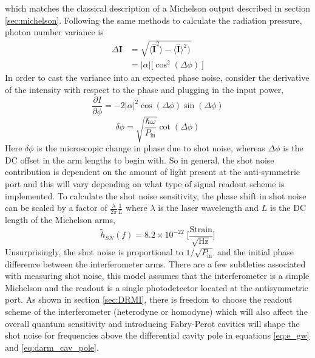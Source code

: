 		which matches the classical description of a Michelson output described in section \ref{sec:michelson}. Following the same methods to calculate the radiation pressure, photon number variance is
		\begin{equation} 
		\begin{aligned}
		\Delta \mathbf{I} 	&= \sqrt{\langle \mathbf{\hat{I}}^2 \rangle  - \langle \mathbf{\hat{I}} \rangle^2)} \\
							&= \vert \alpha \vert \big[ \cos^2(\Delta \phi)\ \big] 
		\end{aligned}
		\end{equation}
		In order to cast the variance into an expected phase noise, consider the derivative of the intensity with respect to the phase and plugging in the input power,
		\begin{equation}
		\frac{\partial I}{\partial \phi} = - 2 \vert \alpha \vert^2\cos(\Delta \phi) \sin(\Delta \phi)
		\end{equation}
		\begin{equation}
		\delta \phi = \sqrt{\frac{\hbar \omega}{ P_{\text{in}}}} \cot(\Delta \phi)
		\end{equation}
		Here $\delta \phi$ is the microscopic change in phase due to shot noise, whereas $\Delta\phi$ is the DC offset in the arm lengths to begin with. So in general, the shot noise contribution is dependent on the amount of light present at the anti-symmetric port and this will vary depending on what type of signal readout scheme is implemented.  To calculate the shot noise sensitivity, the phase shift in shot noise can be scaled by a factor of $\frac{\lambda}{2 \pi}\frac{1}{L}$ where $\lambda$ is the laser wavelength and $L$ is the DC length of the Michelson arms,
		\begin{equation}
		\tilde{h}_{SN}(f) = 8.2\times 10^{-22} \; \bigg[ \frac{\text{Strain}}{\sqrt{\text{Hz}}}\bigg]
		\end{equation}
		Unsurprisingly, the shot noise is proportional to $1/\sqrt{P_{\text{in}}}$ and the initial phase difference between the interferometer arms. There are a few subtleties associated with measuring shot noise, this model assumes that the interferometer is a simple Michelson and the readout is a single photodetector located at the antisymmetric port. As shown in section \ref{sec:DRMI}, there is freedom to choose the readout scheme of the interferometer (heterodyne or homodyne) which will also affect the overall quantum sensitivity and introducing Fabry-Perot cavities will shape the shot noise for frequencies above the differential cavity pole in equations \ref{eq:e_gw} and \ref{eq:darm_cav_pole}.
		
